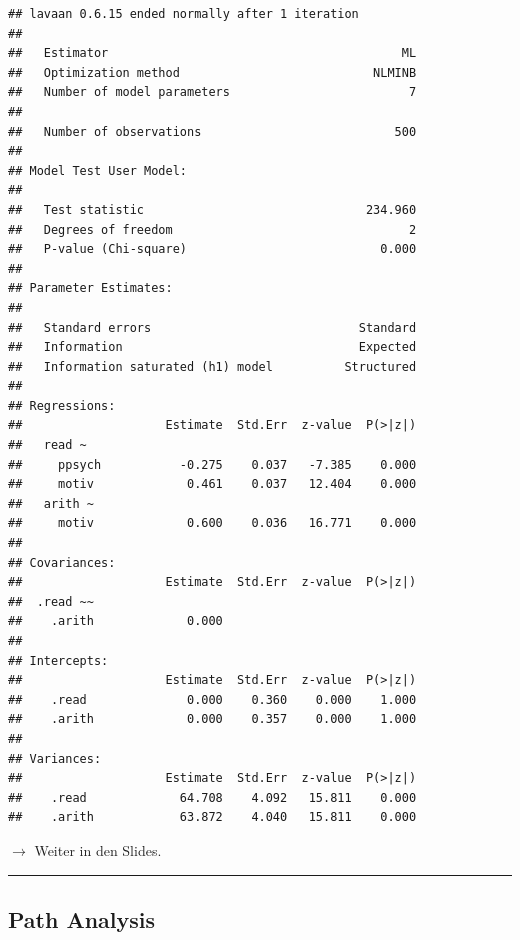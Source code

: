 \documentclass[
]{article}
\begin{document}
\begin{verbatim}
## lavaan 0.6.15 ended normally after 1 iteration
## 
##   Estimator                                         ML
##   Optimization method                           NLMINB
##   Number of model parameters                         7
## 
##   Number of observations                           500
## 
## Model Test User Model:
##                                                       
##   Test statistic                               234.960
##   Degrees of freedom                                 2
##   P-value (Chi-square)                           0.000
## 
## Parameter Estimates:
## 
##   Standard errors                             Standard
##   Information                                 Expected
##   Information saturated (h1) model          Structured
## 
## Regressions:
##                    Estimate  Std.Err  z-value  P(>|z|)
##   read ~                                              
##     ppsych           -0.275    0.037   -7.385    0.000
##     motiv             0.461    0.037   12.404    0.000
##   arith ~                                             
##     motiv             0.600    0.036   16.771    0.000
## 
## Covariances:
##                    Estimate  Std.Err  z-value  P(>|z|)
##  .read ~~                                             
##    .arith             0.000                           
## 
## Intercepts:
##                    Estimate  Std.Err  z-value  P(>|z|)
##    .read              0.000    0.360    0.000    1.000
##    .arith             0.000    0.357    0.000    1.000
## 
## Variances:
##                    Estimate  Std.Err  z-value  P(>|z|)
##    .read             64.708    4.092   15.811    0.000
##    .arith            63.872    4.040   15.811    0.000
\end{verbatim}

\(\rightarrow\) Weiter in den Slides.

\begin{center}\rule{0.5\linewidth}{0.5pt}\end{center}

\hypertarget{path-analysis}{%
\subsection{Path Analysis}\label{path-analysis}}
\end{document}
